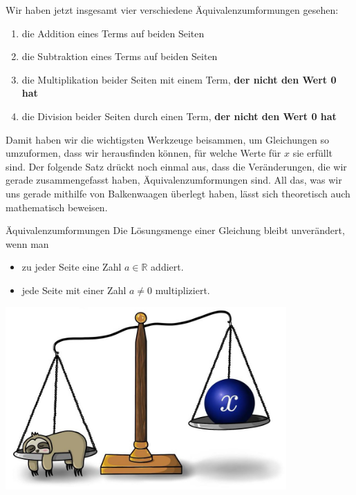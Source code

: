 \documentclass[../../main.tex]{subfiles}
\begin{document}
Wir haben jetzt insgesamt vier verschiedene Äquivalenzumformungen gesehen:
\begin{enumerate}
    \item die Addition eines Terms auf beiden Seiten
    \item die Subtraktion eines Terms auf beiden Seiten
    \item die Multiplikation beider Seiten mit einem Term, \textbf{der nicht den Wert 0 hat}
    \item die Division beider Seiten durch einen Term, \textbf{der nicht den Wert 0 hat}
\end{enumerate}

Damit haben wir die wichtigsten Werkzeuge beisammen, um Gleichungen so umzuformen, dass wir herausfinden können, für welche Werte für $x$ sie erfüllt sind. Der folgende Satz drückt noch einmal aus, dass die Veränderungen, die wir gerade zusammengefasst haben, Äquivalenzumformungen sind. All das, was wir uns gerade mithilfe von Balkenwaagen überlegt haben, lässt sich theoretisch auch mathematisch beweisen.

\begin{theorem}{Äquivalenzumformungen}
    Die Lösungsmenge einer Gleichung bleibt unverändert, wenn man
    \begin{itemize}
        \item zu jeder Seite eine Zahl $a\in\mathbb{R}$ addiert.
        \item jede Seite mit einer Zahl $a\neq 0$ multipliziert.
    \end{itemize}
\end{theorem}

\vfill
\begin{center}    
    \includegraphics[height=7cm]{images/faultier-balkenwaage.jpg}
\end{center}
\newpage
\end{document}
